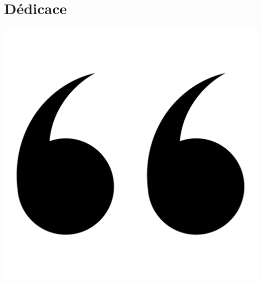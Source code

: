 \chapter*{Dédicace}



\newcommand{\dedicationquote}[1]{%
    \begin{quote}
    \begin{center}
        \large\itshape\color{dedicationquote}
        #1
    \end{center}
    \end{quote}
}


\newcommand{\signature}[1]{%
    \begin{flushright}
        \color{signature}
        \emph{#1}
    \end{flushright}
}
\vspace{1cm}
\hspace{0.4cm}
\includegraphics[scale=0.02]{Logos/quote2.png}
\hspace{5cm}
    

